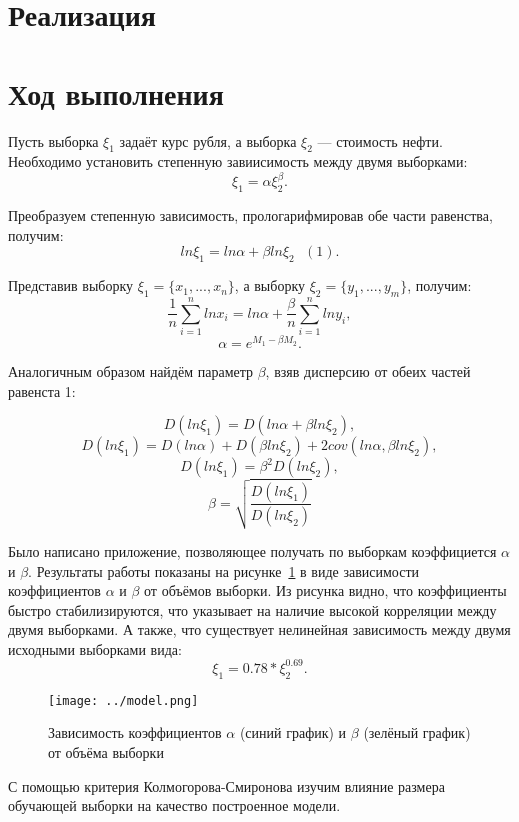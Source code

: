 \documentclass[12pt,a4paper,oneside]{extarticle}
\begin{document}
\section{Реализация}

\section{Ход выполнения}

    Пусть выборка $\xi_1$ задаёт курс рубля, а выборка $\xi_2$ --- стоимость нефти.
    Необходимо установить степенную завиисимость между двумя выборками: $$\xi_1=\alpha\xi_2^{\beta}.$$

    Преобразуем степенную зависимость, прологарифмировав обе части равенства, получим: $$ln \xi_1 = ln \alpha + \beta ln \xi_2~~~ (1).$$


       
    Представив выборку $\xi_1 = \{x_1, . . . , x_n\}$, а выборку $\xi_2 = \{y_1, . . . , y_m\}$, получим:
    $$\frac{1}{n}\sum_{i=1}^{n} ln x_i = ln \alpha + \frac{\beta}{n} \sum_{i=1}^{n} ln y_i,$$
    $$\alpha = e^{M_1-\beta M_2}.$$

    Аналогичным образом найдём параметр $\beta$, взяв дисперсию от обеих частей равенста 1:

    $$D (ln \xi_1) = D(ln \alpha + \beta ln \xi_2),$$
    $$D (ln \xi_1) = D(ln \alpha) + D(\beta ln \xi_2) + 2 cov(ln \alpha, \beta ln \xi_2),$$
    $$D (ln \xi_1) = \beta^2 D(ln \xi_2), $$
    $$\beta = \sqrt{\frac{D (ln \xi_1)}{D (ln \xi_2)}}$$

    Было написано приложение, позволяющее получать по выборкам коэффициется $\alpha$ и $\beta$. Результаты работы показаны на рисунке~\ref{pic:tree} в виде зависимости коэффициентов $\alpha$ и $\beta$ от объёмов выборки. Из рисунка видно, что коэффициенты быстро стабилизируются, что указывает на наличие высокой корреляции между двумя выборками. А также, что существует нелинейная зависимость между двумя исходными выборками вида: $$\xi_1 = 0.78*\xi_2^{0.69}.$$ 

    \begin{figure}[h!]
        \center
        \texttt{[image: ../model.png]}
        \caption{Зависимость коэффициентов $\alpha$ (синий график) и $\beta$ (зелёный график) от объёма выборки}
        \label{pic:tree}
    \end{figure}

    С помощью критерия Колмогорова-Смиронова изучим влияние размера обучающей выборки на качество построенное модели. 
\end{document}
